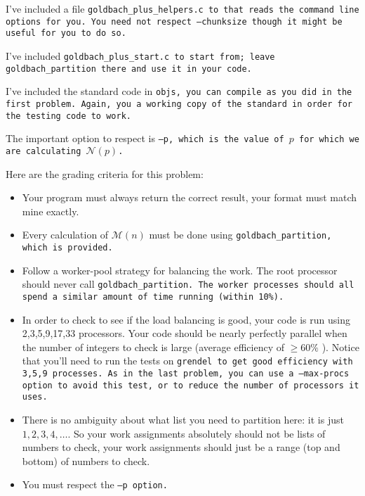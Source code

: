 \documentclass{article}
\newcommand{\M}{\mathcal{M}}
\newcommand{\N}{\mathcal{N}}
\begin{document}
\begin{enumerate}
I've included a file \tt{goldbach\_plus\_helpers.c} to that reads the
command line options for you. You need not respect \tt{--chunksize}
though it might be useful for you to do so. 

I've included \tt{goldbach\_plus\_start.c} to start from; leave
\tt{goldbach\_partition} there and use it in your code. 

I've included the standard code in \tt{objs}, you can compile as you
did in the first problem.  Again, you a working copy of the standard
in order for the testing code to work. 

The important option to respect is \tt{--p}, which is the value of $p$
for which we are calculating $\N(p)$. 

Here are the grading criteria for this problem:
\begin{itemize}
\item Your program must always return the correct result, your format
  must match mine exactly. 
\item Every calculation of $\M(n)$ must be done using
  \tt{goldbach\_partition}, which is provided. 
  \item Follow a worker-pool strategy for balancing the work.  The
    root processor should never call \tt{goldbach\_partition}.  The
    worker processes should all spend a similar amount of time running
    (within 10\%).  
  \item In order to check to see if the load balancing is good, your
    code is run using 2,3,5,9,17,33 processors.  Your code should be
    nearly perfectly parallel when the number of integers to check is
    large (average efficiency of $\ge 60\%$ ). Notice that you'll need to run
    the tests on \tt{grendel} to get good efficiency with 3,5,9
    processes. As in the last problem, you can use a \tt{--max-procs}
    option to avoid this test, or to reduce the number of processors
    it uses. 
  \item There is no ambiguity about what list you need to partition
    here: it is just $1,2,3,4,\dots$. So your work assignments
    absolutely should not be lists of numbers to check, your work
    assignments should just be a range (top and bottom) of numbers to check.

\item You must respect the \tt{--p} option. 
\end{itemize}

\end{enumerate}
\end{document}
